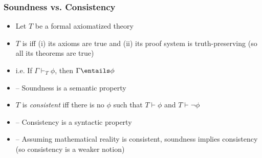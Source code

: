 \begin{frame}
\frametitle{Soundness vs. Consistency}

\begin{itemize}[<+->]

\item Let $T$ be a formal axiomatized theory

\item $T$ is  iff (i) its axioms are true and (ii) its proof system is truth-preserving (so all its theorems are true) \\

\item[] i.e. If $\Gamma \vdash_T \phi$, then $\Gamma \entails \phi$

\item[] -- Soundness is a \textcolor{OGlyallpink}{semantic} property

\item $T$ is \emph{consistent} iff there is no $\phi$ such that $T \vdash \phi$ and $T \vdash \neg \phi$

\item[] -- Consistency is a \textcolor{highlightA}{syntactic} property

\item[] -- Assuming mathematical reality is consistent, soundness implies consistency (so consistency is a weaker notion) 

\end{itemize}
\end{frame}


\iffalse %

